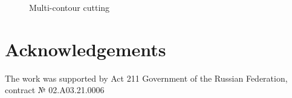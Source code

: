 \documentclass{../download/tPRS2e}
\begin{document}
\begin{figure}[h]
    \begin{center}
    \caption{Multi-contour cutting} \label{mcontour}
    \end{center}
\end{figure}

\section*{Acknowledgements}

The work was supported by Act 211 Government of the Russian Federation, contract № 02.A03.21.0006


\nocite{*}

\end{document}
